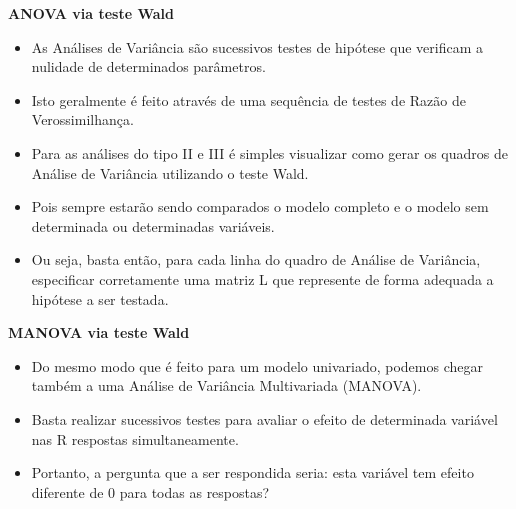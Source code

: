 \documentclass[10pt,
  aspectratio=169,
  serif,
  mathserif,
  professionalfont,
  compress,
  handout,
  ]{beamer}\usepackage[]{graphicx}\usepackage[]{color}
\begin{document}

\begin{frame}[c, allowframebreaks]

\textbf{ANOVA via teste Wald}

\begin{itemize}
  
  	\item As Análises de Variância são sucessivos testes de hipótese que verificam a nulidade de determinados parâmetros. 

	\item Isto geralmente é feito através de uma sequência de testes de Razão de Verossimilhança.

	\item Para as análises do tipo II e III é simples visualizar como gerar os quadros de Análise de Variância utilizando o teste Wald. 

	\item Pois sempre estarão sendo comparados o modelo completo e o modelo sem determinada ou determinadas variáveis. 

	\item Ou seja, basta então, para cada linha do quadro de Análise de Variância, especificar corretamente uma matriz L que represente de forma adequada a hipótese a ser testada.
  
\end{itemize}


\end{frame}


\begin{frame}[c, allowframebreaks]

\textbf{MANOVA via teste Wald}

\begin{itemize}
  
	\item Do mesmo modo que é feito para um modelo univariado, podemos chegar também a uma Análise de Variância Multivariada (MANOVA). 

	\item Basta realizar sucessivos testes para avaliar o efeito de determinada variável nas R respostas simultaneamente. 

	\item Portanto, a pergunta que a ser respondida seria: esta variável tem efeito diferente de 0 para todas as respostas?

\end{itemize}

\end{frame}
\end{document}
